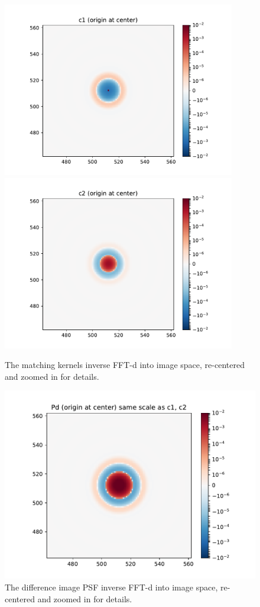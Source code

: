 \documentclass[11pt]{article}
\begin{document}
\begin{figure}
\begin{center}
  \includegraphics[width=4in]{fig/fft_steps_direct_c1_zoomed.pdf}
  \includegraphics[width=4in]{fig/fft_steps_direct_c2_zoomed.pdf}
\end{center}
\caption{\label{fig:fft_steps_direct_c1c2}The matching kernels inverse
  FFT-d into image space, re-centered and zoomed in for
  details.}
\end{figure}
%
\begin{figure}
\begin{center}
\includegraphics[width=5.5in]{fig/fft_steps_direct_Pd_zoomed.pdf}
\end{center}
\caption{\label{fig:fft_steps_direct_Pd}The difference image PSF
  inverse FFT-d into image space, re-centered and zoomed in for
  details.}
\end{figure}
%
\clearpage
%
\end{document}
